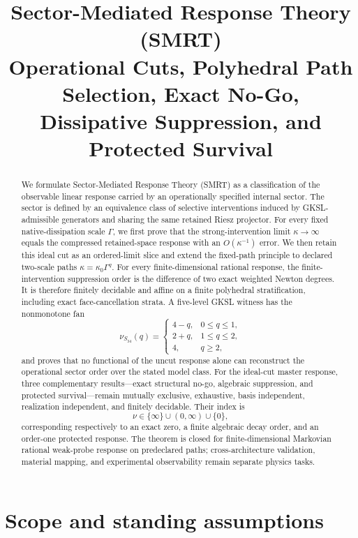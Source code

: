 \documentclass[11pt]{article}
\title{Sector-Mediated Response Theory (SMRT)\\
\large Operational Cuts, Polyhedral Path Selection, Exact No-Go,\\
Dissipative Suppression, and Protected Survival}
\author{}
\date{}
\theoremstyle{definition}
\theoremstyle{remark}
\theoremstyle{plain}
\begin{document}
\maketitle

\begin{abstract}
We formulate Sector-Mediated Response Theory (SMRT) as a classification of the observable linear response carried by an operationally specified internal sector.  The sector is defined by an equivalence class of selective interventions induced by GKSL-admissible generators and sharing the same retained Riesz projector.  For every fixed native-dissipation scale $\Gamma$, we first prove that the strong-intervention limit $\kappa\to\infty$ equals the compressed retained-space response with an $O(\kappa^{-1})$ error.  We then retain this ideal cut as an ordered-limit slice and extend the fixed-path principle to declared two-scale paths $\kappa=\kappa_0\Gamma^q$.  For every finite-dimensional rational response, the finite-intervention suppression order is the difference of two exact weighted Newton degrees.  It is therefore finitely decidable and affine on a finite polyhedral stratification, including exact face-cancellation strata.  A five-level GKSL witness has the nonmonotone fan
\[
 \nu_{S_{34}}(q)=
 \begin{cases}
 4-q,&0\le q\le1,\\
 2+q,&1\le q\le2,\\
 4,&q\ge2,
 \end{cases}
\]
and proves that no functional of the uncut response alone can reconstruct the operational sector order over the stated model class.  For the ideal-cut master response, three complementary results---exact structural no-go, algebraic suppression, and protected survival---remain mutually exclusive, exhaustive, basis independent, realization independent, and finitely decidable.  Their index is
\[
  \nu\in\{\infty\}\cup(0,\infty)\cup\{0\},
\]
corresponding respectively to an exact zero, a finite algebraic decay order, and an order-one protected response.  The theorem is closed for finite-dimensional Markovian rational weak-probe response on predeclared paths; cross-architecture validation, material mapping, and experimental observability remain separate physics tasks.
\end{abstract}

\tableofcontents

\section{Scope and standing assumptions}
\end{document}
